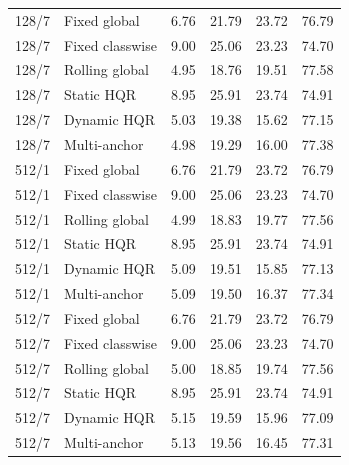 \begin{longtable}{llrrrr}
128/7 & Fixed global & 6.76 & 21.79 & 23.72 & 76.79\\
128/7 & Fixed classwise & 9.00 & 25.06 & 23.23 & 74.70\\
128/7 & Rolling global & 4.95 & 18.76 & 19.51 & 77.58\\
128/7 & Static HQR & 8.95 & 25.91 & 23.74 & 74.91\\
128/7 & Dynamic HQR & 5.03 & 19.38 & 15.62 & 77.15\\
128/7 & Multi-anchor & 4.98 & 19.29 & 16.00 & 77.38\\
512/1 & Fixed global & 6.76 & 21.79 & 23.72 & 76.79\\
512/1 & Fixed classwise & 9.00 & 25.06 & 23.23 & 74.70\\
512/1 & Rolling global & 4.99 & 18.83 & 19.77 & 77.56\\
512/1 & Static HQR & 8.95 & 25.91 & 23.74 & 74.91\\
512/1 & Dynamic HQR & 5.09 & 19.51 & 15.85 & 77.13\\
512/1 & Multi-anchor & 5.09 & 19.50 & 16.37 & 77.34\\
512/7 & Fixed global & 6.76 & 21.79 & 23.72 & 76.79\\
512/7 & Fixed classwise & 9.00 & 25.06 & 23.23 & 74.70\\
512/7 & Rolling global & 5.00 & 18.85 & 19.74 & 77.56\\
512/7 & Static HQR & 8.95 & 25.91 & 23.74 & 74.91\\
512/7 & Dynamic HQR & 5.15 & 19.59 & 15.96 & 77.09\\
512/7 & Multi-anchor & 5.13 & 19.56 & 16.45 & 77.31\\
\end{longtable}\endgroup
